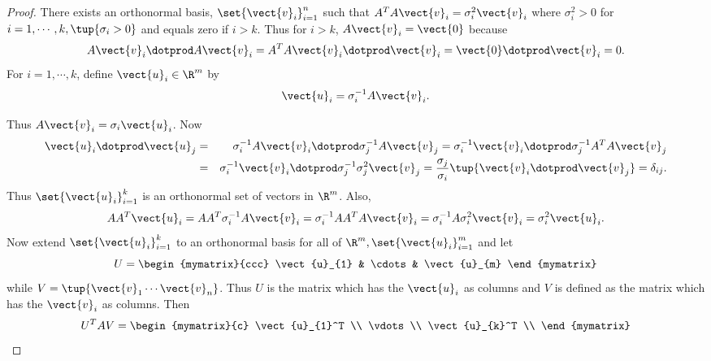 \begin{proof}
There exists an orthonormal basis, $\set{\vect{v}_{i}} _{i=1}^{n}$ such that $
A^TA\vect{v}_{i}=\sigma _{i}^{2}\vect{v}_{i}$ where $\sigma
_{i}^{2}>0$ for $i=1,\cdots ,k,\tup{\sigma _{i}>0} $ and equals zero
if $i>k$. Thus for $i>k$, $A\vect{v}_{i}=\vect{0}$ because 
\begin{equation*}
 A\vect{v}_{i}\dotprod A\vect{v}_{i} = A^TA\vect{v}_{i} \dotprod \vect{v}_{i}  = \vect{0} \dotprod \vect{v}_{i} =0.
\end{equation*}
For $i=1,\cdots ,k$, define $\vect{u}_{i}\in \R^{m}$ by 
\begin{equation*}
\vect{u}_{i}= \sigma _{i}^{-1}A\vect{v}_{i}.
\end{equation*}

Thus $A\vect{v}_{i}=\sigma _{i}\vect{u}_{i}$. Now 
\begin{eqnarray*}
\vect{u}_{i} \dotprod \vect{u}_{j} &=&  \sigma _{i}^{-1}A
\vect{v}_{i} \dotprod \sigma _{j}^{-1}A\vect{v}_{j}  = \sigma_{i}^{-1}\vect{v}_{i} \dotprod \sigma _{j}^{-1}A^TA\vect{v}_{j} \\
&=& \sigma _{i}^{-1}\vect{v}_{i} \dotprod \sigma _{j}^{-1}\sigma _{j}^{2} \vect{v}_{j} =
\frac{\sigma _{j}}{\sigma _{i}}\tup{\vect{v}_{i} \dotprod \vect{v}_{j}}
=\delta _{ij}.
\end{eqnarray*}
Thus $\set{\vect{u}_{i}} _{i=1}^{k}$ is an orthonormal set of
vectors in $\R^{m}$. Also, 
\begin{equation*}
AA^T\vect{u}_{i}=AA^T\sigma _{i}^{-1}A\vect{v}_{i}=\sigma
_{i}^{-1}AA^TA\vect{v}_{i}=\sigma _{i}^{-1}A\sigma _{i}^{2}\vect{v}
_{i}=\sigma _{i}^{2}\vect{u}_{i}.
\end{equation*}
Now extend $\set{\vect{u}_{i}} _{i=1}^{k}$ to an orthonormal
basis for all of $\R^{m},\set{\vect{u}_{i}} _{i=1}^{m}$
and let 
\begin{equation*}
U= \begin{mymatrix}{ccc}
\vect{u}_{1} & \cdots & \vect{u}_{m}
\end{mymatrix}
\end{equation*}
while $V= \tup{\vect{v}_{1}\cdots \vect{v}_{n}}$. Thus $U$
is the matrix which has the $\vect{u}_{i}$ as columns and $V$ is defined
as the matrix which has the $\vect{v}_{i}$ as columns. Then 
\begin{equation*}
U^TAV=\begin{mymatrix}{c}
\vect{u}_{1}^T \\ 
\vdots \\ 
\vect{u}_{k}^T \\ 

\end{mymatrix}
\end{equation*}
\end{proof}
